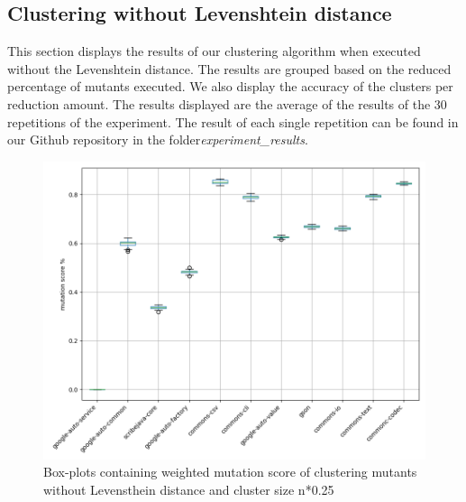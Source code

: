 \documentclass[../../main]{subfiles}
\begin{document}

\subsection{Clustering without Levenshtein distance}
This section displays the results of our clustering algorithm when executed without the Levenshtein distance.
The results are grouped based on the reduced percentage of mutants executed.
We also display the accuracy of the clusters per reduction amount.
The results displayed are the average of the results of the 30 repetitions of the experiment.
The result of each single repetition can be found in our Github repository in the folder\textit{experiment{\_}results}\cite{rbasarat-repo}.

\begin{figure}[H]
\includegraphics[width=\textwidth]{images/boxplot_summary/boxplot_hc_no_distance_0.25.png}
\caption{\label{box:clustering_no_distance_25}Box-plots containing weighted mutation score of clustering mutants without Levensthein distance and cluster size n*0.25}
\end{figure}
\end{document}
